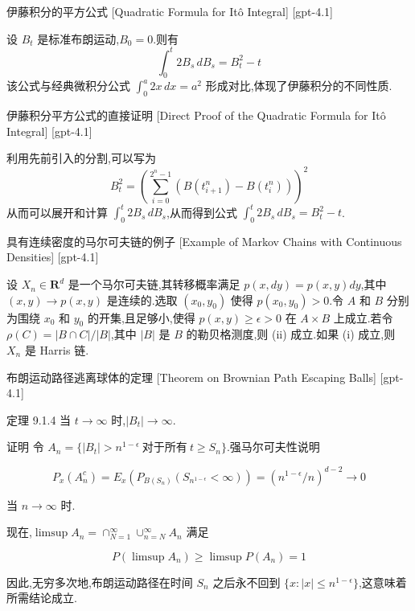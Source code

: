 \documentclass[UTF8]{ctexart}
\begin{document}
    
    
    \begin{thm}
        {伊藤积分的平方公式}
        [Quadratic Formula for Itô Integral]
        [gpt-4.1]
        
设 $B_t$ 是标准布朗运动,$B_0 = 0$.则有
\[
\int_{0}^{t} 2 B_{s}\, dB_{s} = B_{t}^{2} - t
\]
该公式与经典微积分公式 $\int_{0}^{a} 2x\, dx = a^{2}$ 形成对比,体现了伊藤积分的不同性质.

    \end{thm}
    
    
    
    \begin{prf}
        {伊藤积分平方公式的直接证明}
        [Direct Proof of the Quadratic Formula for Itô Integral]
        [gpt-4.1]
        
利用先前引入的分割,可以写为
\[
B_{t}^{2} = \left( \sum_{i=0}^{2^{n} - 1} (B(t_{i+1}^{n}) - B(t_{i}^{n})) \right)^{2}
\]
从而可以展开和计算 $\int_{0}^{t} 2 B_{s}\, dB_{s}$,从而得到公式 $\int_{0}^{t} 2 B_{s}\, dB_{s} = B_{t}^{2} - t$.

    \end{prf}
    
    
    
    \begin{xmp}
        {具有连续密度的马尔可夫链的例子}
        [Example of Markov Chains with Continuous Densities]
        [gpt-4.1]
        
设 $X_n \in \mathbf{R}^d$ 是一个马尔可夫链,其转移概率满足 $p(x, dy) = p(x, y) dy$,其中 $(x, y) \to p(x, y)$ 是连续的.选取 $(x_0, y_0)$ 使得 $p(x_0, y_0) > 0$.令 $A$ 和 $B$ 分别为围绕 $x_0$ 和 $y_0$ 的开集,且足够小,使得 $p(x, y) \geq \epsilon > 0$ 在 $A \times B$ 上成立.若令 $\rho(C) = |B \cap C| / |B|$,其中 $|B|$ 是 $B$ 的勒贝格测度,则 (ii) 成立.如果 (i) 成立,则 $X_n$ 是 Harris 链.

    \end{xmp}
    
    
    
    \begin{thm}
        {布朗运动路径逃离球体的定理}
        [Theorem on Brownian Path Escaping Balls]
        [gpt-4.1]
        
定理 9.1.4 当 $t \to \infty$ 时,$|B_{t}| \to \infty$.

证明 令 $A_{n} = \{ |B_{t}| > n^{1-\epsilon}~\mathrm{对于所有}~t \geq S_{n} \}$.强马尔可夫性说明

\[
P_{x}(A_{n}^{c}) = E_{x}(P_{B(S_{n})}(S_{n^{1-\epsilon}} < \infty)) = (n^{1-\epsilon}/n)^{d-2} \to 0
\]

当 $n \to \infty$ 时.

现在,$\limsup A_{n} = \cap_{N=1}^{\infty} \cup_{n=N}^{\infty} A_{n}$ 满足

\[
P(\limsup A_{n}) \geq \limsup P(A_{n}) = 1
\]

因此,无穷多次地,布朗运动路径在时间 $S_{n}$ 之后永不回到 $\{ x : |x| \leq n^{1-\epsilon} \}$,这意味着所需结论成立.

    \end{thm}
    
\end{document}

